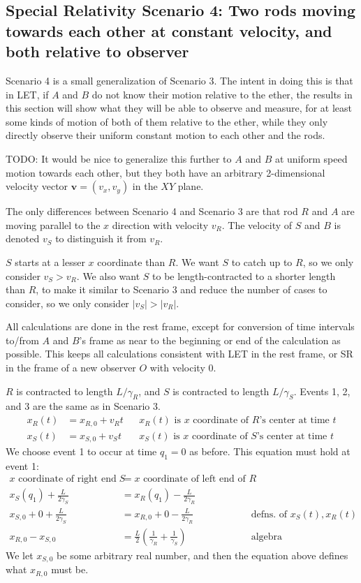 \documentclass[a4paper]{article}
\theoremstyle{plain}
\theoremstyle{definition}
\newcommand{\vect}[1]{\mathbf{#1}}
\begin{document}
\subsection{Special Relativity Scenario 4: Two rods moving towards each other at constant velocity, and both relative to observer}
\label{sec:scen3}

Scenario 4 is a small generalization of Scenario 3.  The intent in
doing this is that in LET, if $A$ and $B$ do not know their motion
relative to the ether, the results in this section will show what they
will be able to observe and measure, for at least some kinds of motion
of both of them relative to the ether, while they only directly
observe their uniform constant motion to each other and the rods.

TODO: It would be nice to generalize this further to $A$ and $B$ at
uniform speed motion towards each other, but they both have an
arbitrary 2-dimensional velocity vector $\vect v = (v_x, v_y)$ in the
$XY$ plane.

The only differences between Scenario 4 and Scenario 3 are that rod
$R$ and $A$ are moving parallel to the $x$ direction with velocity
$v_R$.  The velocity of $S$ and $B$ is denoted $v_S$ to distinguish it
from $v_R$.

$S$ starts at a lesser $x$ coordinate than $R$.  We want $S$ to catch
up to $R$, so we only consider $v_S > v_R$.  We also want $S$ to be
length-contracted to a shorter length than $R$, to make it similar to
Scenario 3 and reduce the number of cases to consider, so we only
consider $|v_S| > |v_R|$.

All calculations are done in the rest frame, except for conversion of
time intervals to/from $A$ and $B$'s frame as near to the beginning or
end of the calculation as possible.  This keeps all calculations
consistent with LET in the rest frame, or SR in the frame of a new
observer $O$ with velocity 0.

$R$ is contracted to length $L/\gamma_{R}$,
and $S$ is contracted to length $L/\gamma_{S}$.
Events 1, 2, and 3 are the same as in Scenario 3.
\begin{align}
x_R(t) & = x_{R,0} + v_R t & & \text{$x_R(t)$ is $x$ coordinate of $R$'s center at time $t$} \\
x_S(t) & = x_{S,0} + v_S t & & \text{$x_S(t)$ is $x$ coordinate of $S$'s center at time $t$}
\end{align}
We choose event 1 to occur at time $q_1=0$ as before.
This equation must hold at event 1:
\begin{align}
\text{$x$ coordinate of right end of $S$} & = \text{$x$ coordinate of left end of $R$} \nonumber \\
x_S(q_1) + \frac{L}{2\gamma_S} & = x_R(q_1) - \frac{L}{2\gamma_R} \nonumber \\
x_{S,0} + 0 + \frac{L}{2\gamma_S} & = x_{R,0} + 0 - \frac{L}{2\gamma_R} & & \text{defns. of $x_S(t), x_R(t)$} \nonumber \\
x_{R,0} - x_{S,0} & = \frac{L}{2} ( \frac{1}{\gamma_R} + \frac{1}{\gamma_S} ) & & \text{algebra} \label{eqn:scen4-xR0}
\end{align}
We let $x_{S,0}$ be some arbitrary real number, and then the equation
above defines what $x_{R,0}$ must be.
\end{document}
